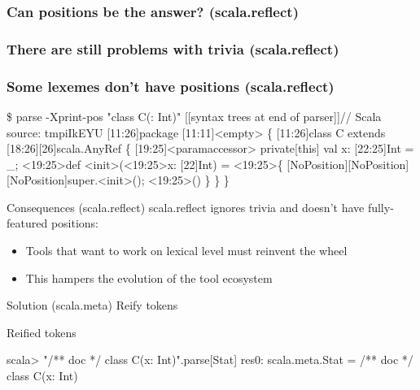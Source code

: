 \documentclass[svgnames,dvipsnames,hyperref={bookmarks=false},usepdftitle=false]{beamer}
\begin{document}
\begin{frame}[fragile]
\frametitle<1>{Can positions be the answer? (scala.reflect)}
\frametitle<2>{There are still problems with trivia (scala.reflect)}
\frametitle<3>{Some lexemes don't have positions (scala.reflect)}
\begin{semiverbatim}
\$ parse \alert<1>{-Xprint-pos} "\alert<2>{class C(: Int)}"
[[syntax trees at end of parser]]// Scala source: tmpiIkEYU
\alert<1>{[11:26]}package \alert<1>{[11:11]}<empty> \{
  \alert<1>{\alert<2>{[11:26]}}class C extends \alert<1>{[18:26][26]}scala.AnyRef \{
    \alert<1>{[19:25]}<paramaccessor> private[this] val x: \alert<1>{[22:25]Int} = _;
    \alert<1>{<19:25>}def <init>(\alert<1>{\alert<3>{<19:25>}}x: \alert<1>{[22]}Int) = \alert<1>{<19:25>}\{
      \alert<1>{[NoPosition][NoPosition][NoPosition]}super.<init>();
      \alert<1>{<19:25>}()
    \}
  \}
\}
\end{semiverbatim}
\end{frame}

\begin{frame}{Consequences (scala.reflect)}
scala.reflect ignores trivia and doesn't have fully-featured positions:
\begin{itemize}
\item Tools that want to work on lexical level must reinvent the wheel
\item This hampers the evolution of the tool ecosystem
\end{itemize}
\end{frame}

\begin{frame}{Solution (scala.meta)}
Reify tokens
\end{frame}

\begin{frame}[fragile]{Reified tokens}
\begin{semiverbatim}
scala> "\alert<1,2>{/** doc */} class C(x: Int)".parse[Stat]
res0: scala.meta.Stat = \alert<1,2>{/** doc */} class C\alert<4>{(}\alert<3>{x}\alert<4>{:} Int)

\end{semiverbatim}
\end{frame}
\end{document}
